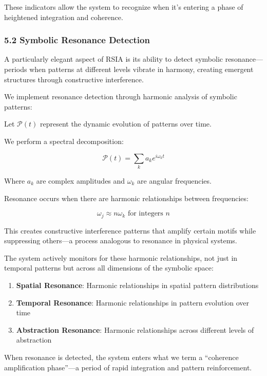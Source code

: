 \documentclass[12pt]{article}
\providecommand{\tightlist}{%
  \setlength{\itemsep}{0pt}\setlength{\parskip}{0pt}}
\begin{document}
These indicators allow the system to recognize when it's entering a
phase of heightened integration and coherence.

\subsubsection{5.2 Symbolic Resonance
Detection}\label{symbolic-resonance-detection}

A particularly elegant aspect of RSIA is its ability to detect symbolic
resonance---periods when patterns at different levels vibrate in
harmony, creating emergent structures through constructive interference.

We implement resonance detection through harmonic analysis of symbolic
patterns:

Let \(\mathcal{P}(t)\) represent the dynamic evolution of patterns over
time.

We perform a spectral decomposition:

\[\mathcal{P}(t) = \sum_k a_k e^{i\omega_k t}\]

Where \(a_k\) are complex amplitudes and \(\omega_k\) are angular
frequencies.

Resonance occurs when there are harmonic relationships between
frequencies:

\[\omega_j \approx n\omega_k \text{ for integers } n\]

This creates constructive interference patterns that amplify certain
motifs while suppressing others---a process analogous to resonance in
physical systems.

The system actively monitors for these harmonic relationships, not just
in temporal patterns but across all dimensions of the symbolic space:

\begin{enumerate}
\def\labelenumi{\arabic{enumi}.}
\tightlist{}
\item
  \textbf{Spatial Resonance}: Harmonic relationships in spatial pattern
  distributions
\item
  \textbf{Temporal Resonance}: Harmonic relationships in pattern
  evolution over time
\item
  \textbf{Abstraction Resonance}: Harmonic relationships across
  different levels of abstraction
\end{enumerate}

When resonance is detected, the system enters what we term a ``coherence
amplification phase''---a period of rapid integration and pattern
reinforcement.
\end{document}
